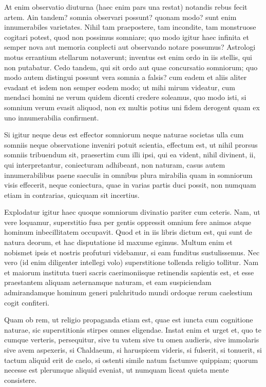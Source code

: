  At enim observatio diuturna (haec enim pars una restat) notandis rebus fecit artem. Ain tandem? somnia observari possunt? quonam modo? sunt enim innumerabiles varietates. Nihil tam praepostere, tam incondite, tam monstruose cogitari potest, quod non possimus somniare; quo modo igitur haec infinita et semper nova aut memoria conplecti aut observando notare possumus? Astrologi motus errantium stellarum notaverunt; inventus est enim ordo in iis stellis, qui non putabatur. Cedo tandem, qui sit ordo aut quae concursatio somniorum; quo modo autem distingui possunt vera somnia a falsis? cum eadem et aliis aliter evadant et isdem non semper eodem modo; ut mihi mirum videatur, cum mendaci homini ne verum quidem dicenti credere soleamus, quo modo isti, si somnium verum evasit aliquod, non ex multis potius uni fidem derogent quam ex uno innumerabilia confirment.

 Si igitur neque deus est effector somniorum neque naturae societas ulla cum somniis neque observatione inveniri potuit scientia, effectum est, ut nihil prorsus somniis tribuendum sit, praesertim cum illi ipsi, qui ea vident, nihil divinent, ii, qui interpretantur, coniecturam adhibeant, non naturam, casus autem innumerabilibus paene saeculis in omnibus plura mirabilia quam in somniorum visis effecerit, neque coniectura, quae in varias partis duci possit, non numquam etiam in contrarias, quicquam sit incertius.

 Explodatur igitur haec quoque somniorum divinatio pariter cum ceteris. Nam, ut vere loquamur, superstitio fusa per gentis oppressit omnium fere animos atque hominum inbecillitatem occupavit. Quod et in iis libris dictum est, qui sunt de natura deorum, et hac disputatione id maxume egimus. Multum enim et nobismet ipsis et nostris profuturi videbamur, si eam funditus sustulissemus. Nec vero (id enim diligenter intellegi volo) superstitione tollenda religio tollitur. Nam et maiorum instituta tueri sacris caerimoniisque retinendis sapientis est, et esse praestantem aliquam aeternamque naturam, et eam suspiciendam admirandamque hominum generi pulchritudo mundi ordoque rerum caelestium cogit confiteri.

 Quam ob rem, ut religio propaganda etiam est, quae est iuncta cum cognitione naturae, sic superstitionis stirpes omnes eligendae. Instat enim et urget et, quo te cumque verteris, persequitur, sive tu vatem sive tu omen audieris, sive immolaris sive avem aspexeris, si Chaldaeum, si haruspicem videris, si fulserit, si tonuerit, si tactum aliquid erit de caelo, si ostenti simile natum factumve quippiam; quorum necesse est plerumque aliquid eveniat, ut numquam liceat quieta mente consistere.

